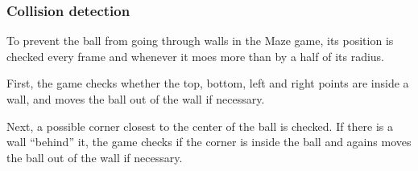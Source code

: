 \documentclass[a4paper,12pt]{article}
\begin{document}
\subsubsection{Collision detection}

To prevent the ball from going through walls in the Maze game, its position
is checked every frame and whenever it moes more than by a half of its radius.

First, the game checks whether the top, bottom, left and right points are
inside a wall, and moves the ball out of the wall if necessary.

Next, a possible corner closest to the center of the ball is checked.
If there is a wall “behind” it, the game checks if the corner is inside the ball
and agains moves the ball out of the wall if necessary.
\end{document}
